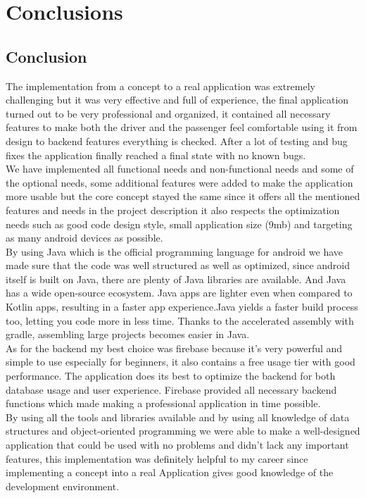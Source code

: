 \chapter{Conclusions}\label{chap:conclusions}

\section{Conclusion}
The implementation from a concept to a real application was extremely challenging but it was very effective and full of experience, the final application turned out to be very professional and organized, it contained all necessary features to make both the driver and the passenger feel comfortable using it from design to backend features everything is checked. After a lot of testing and bug fixes the application finally reached a final state with no known bugs.\\

We have implemented all functional needs and non-functional needs and some of the optional needs, some additional features were added to make the application more usable but the core concept stayed the same since it offers all the mentioned features and needs in the project description it also respects the optimization needs such as good code design style, small application size (9mb) and targeting as many android devices as possible.\\

By using Java which is the official programming language for android we have made sure that the code was well structured as well as optimized, since android itself is built on Java, there are plenty of Java libraries are available. And Java has a wide open-source ecosystem. Java apps are lighter even when compared to Kotlin apps, resulting in a faster app experience.Java yields a faster build process too, letting you code more in less time. Thanks to the accelerated assembly with gradle, assembling large projects becomes easier in Java.\\

As for the backend my best choice was firebase because it’s very powerful and simple to use especially for beginners, it also contains a free usage tier with good performance. The application does its best to optimize the backend for both database usage and user experience. Firebase provided all necessary backend functions which made making a professional application in time possible.\\
 
By using all the tools and libraries available and by using all knowledge of data structures and object-oriented programming we were able to make a well-designed application that could be used with no problems and didn’t lack any important features, this implementation was definitely helpful to my career since implementing a concept into a real Application gives good knowledge of the development environment.

